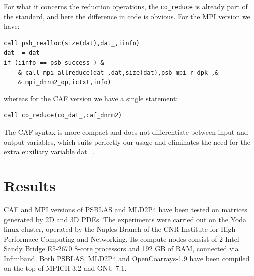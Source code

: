 \documentclass{IOS-Book-Article}
\begin{document}
For what it concerns the reduction operations, the \verb|co_reduce| is
already part of the standard, and here the difference in code is
obvious. For the  MPI version we have:
\begin{center}
{\small
\begin{lstlisting}
call psb_realloc(size(dat),dat_,iinfo)
dat_ = dat
if (iinfo == psb_success_) &
    & call mpi_allreduce(dat_,dat,size(dat),psb_mpi_r_dpk_,&
    & mpi_dnrm2_op,ictxt,info)

\end{lstlisting}}
\end{center}
whereas for  the CAF version we have a single statement: 
\begin{center}
{\small
\begin{lstlisting}
call co_reduce(co_dat_,caf_dnrm2)
\end{lstlisting}}
\end{center}
The CAF syntax is more compact and does not differentiate between
input and output variables, which suits perfectly our usage and
eliminates the need for  the extra euxiliary variable dat\_. 



\section{Results}
CAF and MPI versions of PSBLAS and MLD2P4 have been tested on matrices
generated by 2D and 3D PDEs. 
The experiments were carried out on the Yoda linux cluster, operated
by the Naples Branch of the CNR Institute for High-Performace
Computing and Networking. Its compute nodes consist of 2 Intel Sandy
Bridge E5-2670 8-core processors and 192 GB of RAM, connected via
Infiniband. 
Both PSBLAS, MLD2P4 and OpenCoarrays-1.9 have been compiled on the top
of MPICH-3.2 and GNU 7.1. 
\end{document}
